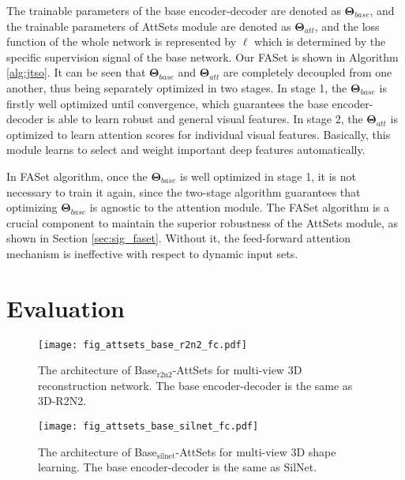\documentclass[twocolumn]{svjour3}    \pdfoutput=1
\newcommand{\nickname}{AttSets}
\newcommand{\faset}{FASet}
\newcommand{\rev}{}
\begin{document}
The trainable parameters of the base encoder-decoder are denoted as $\boldsymbol{\Theta}_{base}$, and the trainable parameters of \nickname{} module are denoted as $\boldsymbol{\Theta}_{att}$, and the loss function of the whole network is represented by $\ell$ which is determined by the specific supervision signal of the base network. Our \faset{} is shown in Algorithm \ref{alg:jtso}. It can be seen that $\boldsymbol{\Theta}_{base}$ and $\boldsymbol{\Theta}_{att}$ are completely decoupled from one another, thus being separately optimized in two stages. In stage 1, the $\boldsymbol{\Theta}_{base}$ is firstly well optimized until convergence, which guarantees the base encoder-decoder is able to learn robust and general visual features. In stage 2, the $\boldsymbol{\Theta}_{att}$ is optimized to learn attention scores for individual visual features. Basically, this module learns to select and weight important deep features automatically. 

\rev{In \faset{} algorithm, once the} $\boldsymbol{\Theta}_{base}$ \rev{is well optimized in stage 1, it is not necessary to train it again, since the two-stage algorithm guarantees that optimizing} $\boldsymbol{\Theta}_{base}$ \rev{is agnostic to the attention module. The \faset{} algorithm is a crucial component to maintain the superior robustness of the \nickname{} module, as shown in Section} \ref{sec:sig_faset}. \rev{Without it, the feed-forward attention mechanism is ineffective with respect to dynamic input sets.}

\section{Evaluation}
\begin{figure}[t]
\centering
   \texttt{[image: fig\_attsets\_base\_r2n2\_fc.pdf]}
\caption{The architecture of Base$_{\textrm{r2n2}}$-AttSets for multi-view 3D reconstruction network. The base encoder-decoder is the same as 3D-R2N2.}
\label{fig:fig_attsets_base_r2n2_fc}
\vspace{-0.15cm}
\end{figure}

\begin{figure}[t]
\centering
   \texttt{[image: fig\_attsets\_base\_silnet\_fc.pdf]}
\caption{The architecture of Base$_{\textrm{silnet}}$-AttSets for multi-view 3D shape learning. The base encoder-decoder is the same as SilNet.}
\label{fig:fig_attsets_base_silnet_fc}
\vspace{-0.35cm}
\end{figure}
\end{document}
